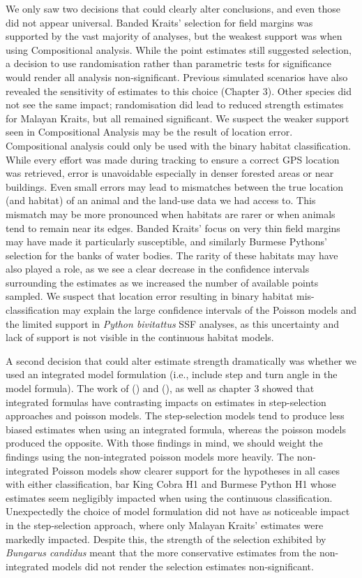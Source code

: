 \documentclass[10pt,a4paper]{article}
\begin{document}
We only saw two decisions that could clearly alter conclusions, and even those did not appear universal.
Banded Kraits' selection for field margins was supported by the vast majority of analyses, but the weakest support was when using Compositional analysis.
While the point estimates still suggested selection, a decision to use randomisation rather than parametric tests for significance would render all analysis non-significant.
Previous simulated scenarios have also revealed the sensitivity of estimates to this choice (Chapter 3).
Other species did not see the same impact; randomisation did lead to reduced strength estimates for Malayan Kraits, but all remained significant.
We suspect the weaker support seen in Compositional Analysis may be the result of location error.
Compositional analysis could only be used with the binary habitat classification.
While every effort was made during tracking to ensure a correct GPS location was retrieved, error is unavoidable especially in denser forested areas or near buildings.
Even small errors may lead to mismatches between the true location (and habitat) of an animal and the land-use data we had access to.
This mismatch may be more pronounced when habitats are rarer or when animals tend to remain near its edges.
Banded Kraits' focus on very thin field margins may have made it particularly susceptible, and similarly Burmese Pythons' selection for the banks of water bodies.
The rarity of these habitats may have also played a role, as we see a clear decrease in the confidence intervals surrounding the estimates as we increased the number of available points sampled.
We suspect that location error resulting in binary habitat mis-classification may explain the large confidence intervals of the Poisson models and the limited support in \emph{Python bivitattus} SSF analyses, as this uncertainty and lack of support is not visible in the continuous habitat models.

A second decision that could alter estimate strength dramatically was whether we used an integrated model formulation (i.e., include step and turn angle in the model formula).
The work of () and (), as well as chapter 3 showed that integrated formulas have contrasting impacts on estimates in step-selection approaches and poisson models.
The step-selection models tend to produce less biased estimates when using an integrated formula, whereas the poisson models produced the opposite.
With those findings in mind, we should weight the findings using the non-integrated poisson models more heavily.
The non-integrated Poisson models show clearer support for the hypotheses in all cases with either classification, bar King Cobra H1 and Burmese Python H1 whose estimates seem negligibly impacted when using the continuous classification.
Unexpectedly the choice of model formulation did not have as noticeable impact in the step-selection approach, where only Malayan Kraits' estimates were markedly impacted.
Despite this, the strength of the selection exhibited by \emph{Bungarus candidus} meant that the more conservative estimates from the non-integrated models did not render the selection estimates non-significant.
\end{document}

